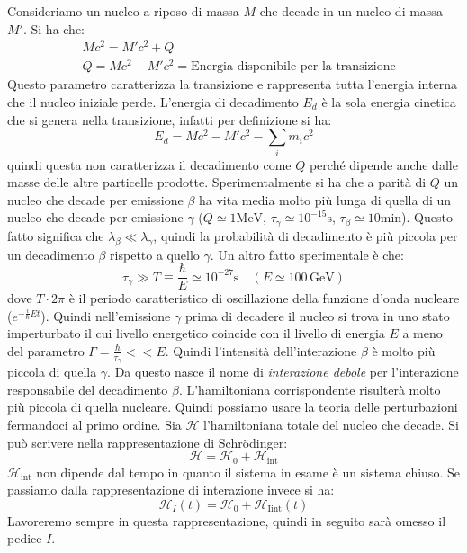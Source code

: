 Consideriamo un nucleo a riposo di massa $M$ che decade in un nucleo di massa $M'$. Si ha che:
\begin{align*}
&Mc^2=M'c^2+Q\\
&Q=Mc^2-M'c^2=\text{Energia disponibile per la transizione}
\end{align*}
Questo parametro caratterizza la transizione e rappresenta tutta l'energia interna che il nucleo iniziale perde. L'energia di decadimento $E_d$ è la sola energia cinetica
che si genera nella transizione, infatti per definizione si ha:
\[
E_d=Mc^2-M'c^2-\sum_i m_ic^2
\]
quindi questa non caratterizza il decadimento come $Q$ perché dipende anche dalle masse delle altre particelle prodotte. Sperimentalmente si ha che a parità di $Q$ un nucleo che decade
per emissione $\beta$ ha vita media molto più lunga di quella di un nucleo che decade per emissione $\gamma$ ($Q\simeq1\si{\mega\electronvolt}$, $\tau_{\gamma}\simeq10^{-15}\si{\second}$,
$\tau_{\beta}\simeq10\text{min}$).
Questo fatto significa che $\lambda_{\beta}\ll\lambda_{\gamma}$, quindi la probabilità di decadimento è più piccola per un decadimento $\beta$ rispetto a quello $\gamma$.
Un altro fatto sperimentale è che:
\[
\tau_{\gamma}\gg T\equiv\frac{\hbar}{E}\simeq10^{-27}\si{\second}\quad(E\simeq100\,\si{\giga\electronvolt})
\]
dove $T\cdot2\pi$ è il periodo caratteristico di oscillazione della funzione d'onda nucleare ($e^{-\frac{i}{\hbar}Et}$). Quindi nell'emissione $\gamma$ prima di decadere il nucleo
si trova in uno stato imperturbato il cui livello energetico coincide con il livello di energia $E$ a meno del parametro $\Gamma=\frac{\hbar}{\tau_{\gamma}}<<E$. Quindi l'intensità
dell'interazione $\beta$ è molto più piccola di quella $\gamma$. Da questo nasce il nome di \textit{interazione debole} per l'interazione responsabile del decadimento $\beta$.
L'hamiltoniana corrispondente risulterà molto più piccola di quella nucleare. Quindi possiamo usare la teoria delle perturbazioni fermandoci al primo ordine.
Sia $\mathcal{H}$ l'hamiltoniana totale del nucleo che decade. Si può scrivere nella rappresentazione di Schr\"{o}dinger:
\[
\mathcal{H}=\mathcal{H}_0+\mathcal{H}_{\text{int}}
\]
$\mathcal{H}_{\text{int}}$ non dipende dal tempo in quanto il sistema in esame è un sistema chiuso. Se passiamo dalla rappresentazione di interazione invece si ha:
\[
\mathcal{H}_I(t)=\mathcal{H}_0+\mathcal{H}_{\text{Iint}}(t)
\]
Lavoreremo sempre in questa rappresentazione, quindi in seguito sarà omesso il pedice $I$.

